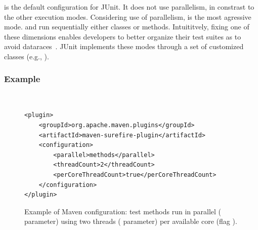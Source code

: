 \Seq{} is the default configuration for JUnit.  It does not use
parallelism, in constrast to the other execution modes.  Considering
use of parallelism, \ParClassParMeth{} is the most agressive mode.
\ParClassSeqMeth{} and \SeqClassParMeth{} run sequentially either
classes or methods.  Intuititvely, fixing one of these dimensions
enables developers to better organize their test suites as to avoid
dataraces~.  JUnit implements these modes through a set of
customized classes (e.g., ).

\subsubsection*{Example}~ 

\begin{figure}[h!]
\centering
\scriptsize
{}
\begin{lstlisting}
<plugin>
    <groupId>org.apache.maven.plugins</groupId>
    <artifactId>maven-surefire-plugin</artifactId>
    <configuration>
        <parallel>methods</parallel>
        <threadCount>2</threadCount>
        <perCoreThreadCount>true</perCoreThreadCount>
    </configuration>
</plugin>
\end{lstlisting}
\caption{\label{fig:surefire} Example of Maven configuration: test
  methods run in parallel ( parameter) using two
  threads ( parameter) per available core (flag
  ).}
\end{figure}





